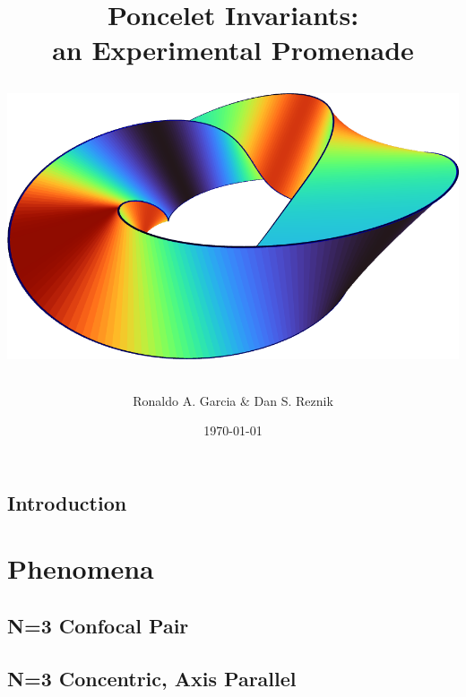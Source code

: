 \documentclass{book}
\begin{document}

\title{
{\bf Poncelet Invariants:}\\
{\bf an Experimental Promenade}
\author{Ronaldo A. Garcia \& Dan S. Reznik} 
\date{\today}
 \vfill
{\includegraphics[totalheight=2.2in]{001_front_cover.png}}
}


\maketitle

\chapter{Introduction}
\label{chap:01-intro}


\part{ Phenomena}

\chapter{N=3 Confocal Pair}
\label{chap:03-n3-confocal}


\chapter{N=3 Concentric, Axis Parallel}
\label{chap:03-n3-cap}

\end{document}
